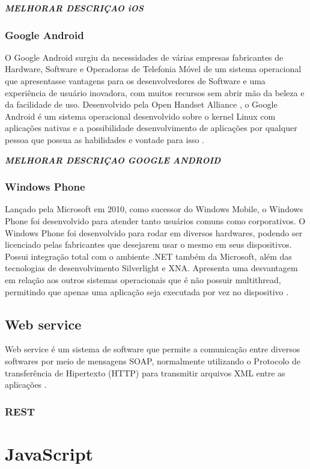 \emph{\bf{MELHORAR DESCRIÇAO iOS}}

\subsubsection{Google Android}
O Google Android surgiu da necessidades de várias empresas fabricantes de Hardware, Software e Operadoras de Telefonia Móvel de um sistema operacional que apresentasse vantagens para os desenvolvedores de Software e uma experiência de usuário inovadora, com muitos recursos sem abrir mão da beleza e da facilidade de uso. Desenvolvido pela Open Handset Alliance \cite{OHA}, o Google Android é um sistema operacional desenvolvido sobre o kernel Linux com aplicações nativas e a possibilidade desenvolvimento de aplicações por qualquer pessoa que possua as habilidades e vontade para isso \cite{lechetagoogle}.

\emph{\bf{MELHORAR DESCRIÇAO GOOGLE ANDROID}}

\subsubsection{Windows Phone}
Lançado pela Microsoft em 2010, como sucessor do Windows Mobile, o Windows Phone foi desenvolvido para atender tanto usuários comuns como corporativos. O Windows Phone foi desenvolvido para rodar em diversos hardwares, podendo ser licenciado pelas fabricantes que desejarem usar o mesmo em seus dispositivos. Possui integração total com o ambiente .NET também da Microsoft, além das tecnologias de desenvolvimento Silverlight e XNA. Apresenta uma desvantagem em relação aos outros sistemas operacionais que é não possuir multithread, permitindo que apenas uma aplicação seja executada por vez no dispositivo \cite{AvaliacaoComparativaSOMoveis}.

\subsection{Web service}
Web service é um sistema de software que permite a comunicação entre diversos softwares por meio de mensagens SOAP, normalmente utilizando o Protocolo de transferência de Hipertexto (HTTP) para transmitir arquivos XML entre as aplicações \cite{W3C}.
\subsubsection{REST}

\section{JavaScript}
